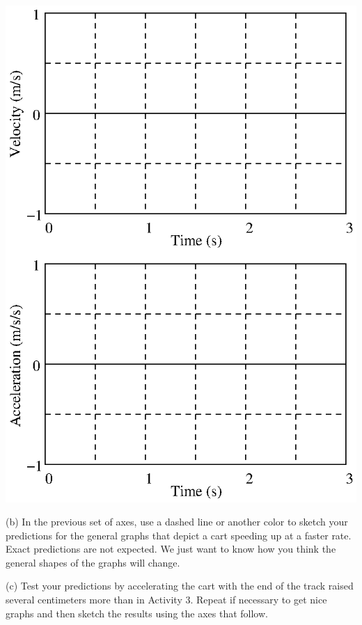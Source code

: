 \vspace{0.3cm}
{\par\centering \includegraphics{changing_fig5.eps} \par}
\vspace{0.3cm}

(b) In the previous set of axes, use a dashed line or another color to sketch
your predictions for the general graphs that depict a cart speeding up at a
faster rate. Exact predictions are not expected. We just want to know how you
think the general shapes of the graphs will change.

(c) Test your predictions by accelerating the cart with the end of the track raised several centimeters more than in Activity 3. Repeat if necessary to get nice graphs and then sketch the results using the axes that follow.

